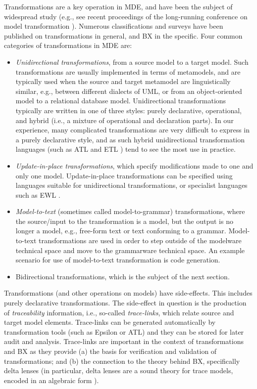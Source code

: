 Transformations are a key operation in MDE, and have been the subject of widespread study (e.g., see recent proceedings of the long-running conference on model transformation \cite{icmt2016}). Numerous classifications and surveys have been published on transformations in general, and BX in the specific. Four common categories of transformations in MDE are:
\begin{itemize}
\item \textit{Unidirectional transformations}, from a source model to a target model. Such transformations are usually implemented in terms of metamodels, and are typically used when the source and target metamodel are linguistically similar, e.g., between different dialects of UML, or from an object-oriented model to a relational database model. Unidirectional transformations typically are written in one of three styles: purely declarative, operational, and hybrid (i.e., a mixture of operational and declaration parts). In our experience, many complicated transformations are very difficult to express in a purely declarative style, and as such hybrid unidirectional transformation languages (such as ATL \cite{JouaultABK08} and ETL \cite{Kolovos2008}) tend to see the most use in practice.

\item \textit{Update-in-place transformations}, which specify modifications made to one and only one model. Update-in-place transformations can be specified using languages suitable for unidirectional transformations, or specialist languages such as EWL \cite{KolovosPPR07}.

\item \textit{Model-to-text} (sometimes called model-to-grammar) transformations, where the source/input to the transformation is a model, but the output is no longer a model, e.g., free-form text or text conforming to a grammar. Model-to-text transformations are used in order to step outside of the modelware technical space and move to the grammarware technical space. An example scenario for use of model-to-text transformation is code generation.

\item Bidirectional transformations, which is the subject of the next section.
\end{itemize}
Transformations (and other operations on models) have side-effects. This includes purely declarative transformations. The side-effect in question is the production of \textit{traceability} information, i.e., so-called \textit{trace-links}, which relate source and target model elements. Trace-links can be generated automatically by transformation tools (such as Epsilon or ATL) and they can be stored for later audit and analysis. Trace-links are important in the context of transformations and BX as they provide (a) the basis for verification and validation of transformations; and (b) the connection to the theory behind BX, specifically delta lenses (in particular, delta lenses are a sound theory for trace models, encoded in an algebraic form \cite{DiskinXC10}).

